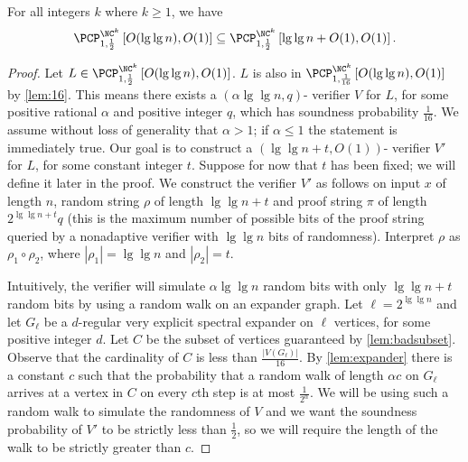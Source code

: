 \documentclass[]{article}
\newcommand{\PCPcs}[5]{\PCP^{#1}_{#2, #3}\left[#4, #5\right]}
\begin{document}
\begin{lemma}[{\cite[Lemma~4]{fs96}}]\label{lem:derandomize}
  For all integers $k$ where $k \geq 1$, we have
  \begin{equation*}
    \PCPcs{\NC^k}{1}{\frac{1}{2}}{O(\lg \lg n)}{O(1)}
    \subseteq
    \PCPcs{\NC^k}{1}{\frac{1}{2}}{\lg \lg n + O(1)}{O(1)}.
  \end{equation*}
\end{lemma}
\begin{proof}
  Let $L \in \PCPcs{\NC^k}{1}{\frac{1}{2}}{O(\lg \lg n)}{O(1)}$.
  $L$ is also in $\PCPcs{\NC^k}{1}{\frac{1}{16}}{O(\lg \lg n)}{O(1)}$ by \autoref{lem:16}.
  This means there exists a $(\alpha \lg \lg n, q)$-\PCP{} verifier $V$ for $L$, for some positive rational $\alpha$ and positive integer $q$, which has soundness probability $\frac{1}{16}$.
  We assume without loss of generality that $\alpha > 1$; if $\alpha \leq 1$ the statement is immediately true.
  Our goal is to construct a $(\lg \lg n + t, O(1))$-\PCP{} verifier $V'$ for $L$, for some constant integer $t$.
  Suppose for now that $t$ has been fixed; we will define it later in the proof.
  We construct the verifier $V'$ as follows on input $x$ of length $n$, random string $\rho$ of length $\lg \lg n + t$ and proof string $\pi$ of length $2^{\lg \lg n + t} q$ (this is the maximum number of possible bits of the proof string queried by a nonadaptive verifier with $\lg \lg n$ bits of randomness).
  Interpret $\rho$ as $\rho_1 \circ \rho_2$, where $|\rho_1| = \lg \lg n$ and $|\rho_2| = t$.

  Intuitively, the verifier will simulate $\alpha \lg \lg n$ random bits with only $\lg \lg n + t$ random bits by using a random walk on an expander graph.
  Let $\ell = 2^{\lg \lg n}$ and let $G_\ell$ be a $d$-regular very explicit spectral expander on $\ell$ vertices, for some positive integer $d$.
  Let $C$ be the subset of vertices guaranteed by \autoref{lem:badsubset}.
  Observe that the cardinality of $C$ is less than $\frac{|V(G_\ell)|}{16}$.
  By \autoref{lem:expander} there is a constant $c$ such that the probability that a random walk of length $\alpha c$ on $G_\ell$ arrives at a vertex in $C$ on every $c$th step is at most $\frac{1}{2^\alpha}$.
  We will be using such a random walk to simulate the randomness of $V$ and we want the soundness probability of $V'$ to be strictly less than $\frac{1}{2}$, so we will require the length of the walk to be strictly greater than $c$.


\end{proof}
\end{document}
